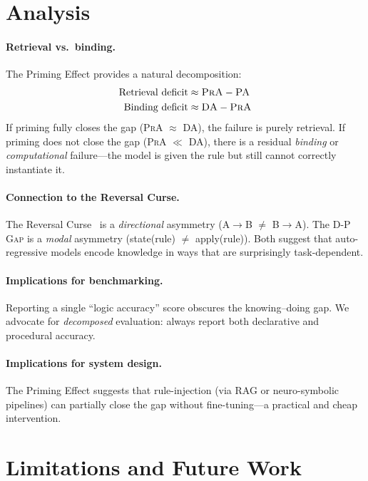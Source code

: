 \documentclass{article}
\newcommand{\dpgap}{\textsc{D-P Gap}}
\newcommand{\da}{\textsc{DA}}
\newcommand{\pa}{\textsc{PA}}
\newcommand{\pra}{\textsc{PrA}}
\begin{document}
\section{Analysis}

\paragraph{Retrieval vs.\ binding.}
The Priming Effect provides a natural decomposition:
\begin{align*}
\text{Retrieval deficit} &\approx \pra - \pa \\
\text{Binding deficit} &\approx \da - \pra
\end{align*}
If priming fully closes the gap (\pra{} $\approx$ \da{}), the
failure is purely retrieval.
If priming does not close the gap (\pra{} $\ll$ \da{}), there is a
residual \emph{binding} or \emph{computational} failure---the model
is given the rule but still cannot correctly instantiate it.

\paragraph{Connection to the Reversal Curse.}
The Reversal Curse~\cite{berglund2024reversal} is a
\emph{directional} asymmetry (A$\to$B $\neq$ B$\to$A).
The \dpgap{} is a \emph{modal} asymmetry
(state(rule) $\neq$ apply(rule)).
Both suggest that auto-regressive models encode knowledge in ways
that are surprisingly task-dependent.

\paragraph{Implications for benchmarking.}
Reporting a single ``logic accuracy'' score obscures the knowing--doing
gap.
We advocate for \emph{decomposed} evaluation: always report both
declarative and procedural accuracy.

\paragraph{Implications for system design.}
The Priming Effect suggests that rule-injection (via RAG or
neuro-symbolic pipelines) can partially close the gap without
fine-tuning---a practical and cheap intervention.

\section{Limitations and Future Work}
\end{document}
